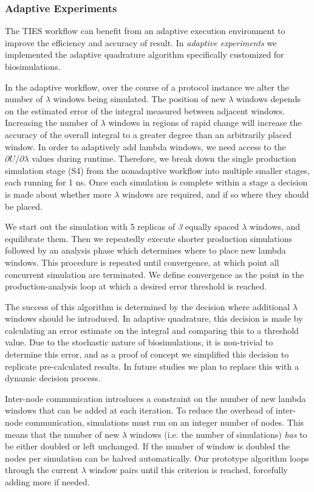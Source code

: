 \subsubsection{Adaptive Experiments}

The TIES workflow can benefit from an adaptive execution environment to
improve the efficiency and accuracy of result. In \emph{adaptive experiments}
we implemented the adaptive quadrature algorithm specifically customized for
biosimulations.

In the adaptive workflow, over the course of a protocol instance we alter the
number of $\lambda$ windows being simulated. The position of new $\lambda$
windows depends on the estimated error of the integral measured between
adjacent windows. Increasing the number of $\lambda$ windows in regions of
rapid change will increase the accuracy of the overall integral to a greater
degree than an arbitrarily placed window. In order to adaptively add lambda
windows, we need access to the $\partial U/\partial\lambda$ values during
runtime. Therefore, we break down the single production simulation stage (S4)
from the nonadaptive workflow into multiple smaller stages, each running for
1 ns. Once each simulation is complete within a stage a decision is made
about whether more $\lambda$ windows are required, and if so where they
should be placed.

We start out the simulation with 5 replicas of \emph{3} equally spaced
$\lambda$ windows, and equilibrate them. Then we repeatedly execute shorter
production simulations followed by an analysis phase which determines where
to place new lambda windows. This procedure is repeated until convergence, at
which point all concurrent simulation are terminated. We define convergence
as the point in the production-analysis loop at which a desired error
threshold is reached.

The success of this algorithm is determined by the decision where additional
$\lambda$ windows should be introduced. In adaptive quadrature, this decision
is made by calculating an error estimate on the integral and comparing this
to a threshold value. Due to the stochastic nature of biosimulations, it is
non-trivial to determine this error, and as a proof of concept we simplified
this decision to replicate pre-calculated results. In future studies we plan
to replace this with a dynamic decision process.

Inter-node communication introduces a constraint on the number of new lambda
windows that can be added at each iteration. To reduce the overhead of
inter-node communication, simulations must run on an integer number of nodes.
This means that the number of new $\lambda$ windows (i.e. the number of
simulations) \emph{has} to be either doubled or left unchanged. If the number
of window is doubled the nodes per simulation can be halved automatically.
Our prototype algorithm loops through the current $\lambda$ window pairs
until this criterion is reached, forcefully adding more if needed.


